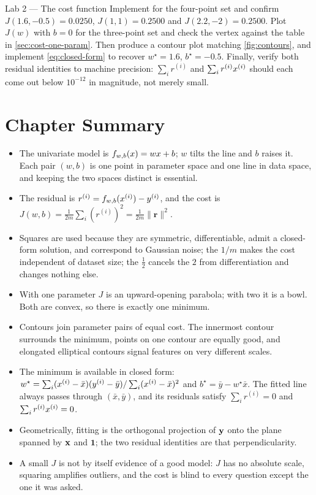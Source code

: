 \begin{labbox}{Lab 2 --- The cost function}
Implement  for the four-point set and confirm
$J(1.6,-0.5) = 0.0250$, $J(1,1) = 0.2500$ and $J(2.2,-2) = 0.2500$. Plot $J(w)$
with $b=0$ for the three-point set and check the vertex against the table in
\cref{sec:cost-one-param}. Then produce a contour plot matching
\cref{fig:contours}, and implement \cref{eq:closed-form} to recover
$w^\star = 1.6$, $b^\star = -0.5$. Finally, verify both residual identities to
machine precision: $\sum_i r^{(i)}$ and $\sum_i r^{(i)}x^{(i)}$ should each come
out below $10^{-12}$ in magnitude, not merely small.
\end{labbox}

\section*{Chapter Summary}

\begin{itemize}
  \item The univariate model is $f_{w,b}(x) = wx+b$; $w$ tilts the line and $b$
        raises it. Each pair $(w,b)$ is one point in parameter space and one
        line in data space, and keeping the two spaces distinct is essential.
  \item The residual is $r^{(i)} = f_{w,b}(x^{(i)}) - y^{(i)}$, and the cost is
        $J(w,b) = \frac{1}{2m}\sum_i (r^{(i)})^2 = \frac{1}{2m}\|\mathbf{r}\|^2$.
  \item Squares are used because they are symmetric, differentiable, admit a
        closed-form solution, and correspond to Gaussian noise; the $1/m$ makes
        the cost independent of dataset size; the $\tfrac12$ cancels the $2$
        from differentiation and changes nothing else.
  \item With one parameter $J$ is an upward-opening parabola; with two it is a
        bowl. Both are convex, so there is exactly one minimum.
  \item Contours join parameter pairs of equal cost. The innermost contour
        surrounds the minimum, points on one contour are equally good, and
        elongated elliptical contours signal features on very different scales.
  \item The minimum is available in closed form:
        $w^\star = \sum_i (x^{(i)}-\bar x)(y^{(i)}-\bar y) / \sum_i (x^{(i)}-\bar
        x)^2$ and $b^\star = \bar y - w^\star\bar x$. The fitted line always
        passes through $(\bar x, \bar y)$, and its residuals satisfy
        $\sum_i r^{(i)} = 0$ and $\sum_i r^{(i)}x^{(i)} = 0$.
  \item Geometrically, fitting is the orthogonal projection of $\mathbf{y}$ onto the
        plane spanned by $\mathbf{x}$ and $\mathbf{1}$; the two residual identities are
        that perpendicularity.
  \item A small $J$ is not by itself evidence of a good model: $J$ has no
        absolute scale, squaring amplifies outliers, and the cost is blind to
        every question except the one it was asked.
\end{itemize}

